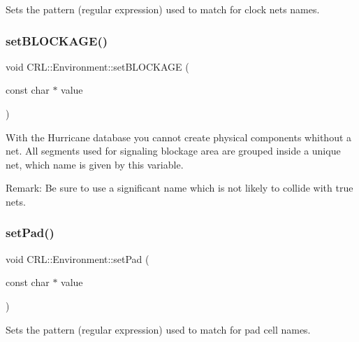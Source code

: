 Sets the pattern (regular expression) used to match for clock nets names. \mbox{\label{classCRL_1_1Environment_af18cbbcdfb458b69dbb6de0dbb564a3a}} 
\subsubsection{\texorpdfstring{set\+B\+L\+O\+C\+K\+A\+G\+E()}{setBLOCKAGE()}}
{\footnotesize\ttfamily void C\+R\+L\+::\+Environment\+::set\+B\+L\+O\+C\+K\+A\+GE (\begin{DoxyParamCaption}\item[{const char $\ast$}]{value }\end{DoxyParamCaption})}

With the Hurricane database you cannot create physical components whithout a net. All segments used for signaling blockage area are grouped inside a unique net, which name is given by this variable.

\begin{DoxyParagraph}{Remark\+:}
Be sure to use a significant name which is not likely to collide with true nets. 
\end{DoxyParagraph}
\mbox{\label{classCRL_1_1Environment_a06c179d70d3065f0bfe398a02e4c6359}} 
\subsubsection{\texorpdfstring{set\+Pad()}{setPad()}}
{\footnotesize\ttfamily void C\+R\+L\+::\+Environment\+::set\+Pad (\begin{DoxyParamCaption}\item[{const char $\ast$}]{value }\end{DoxyParamCaption})}

Sets the pattern (regular expression) used to match for pad cell names. \mbox{\label{classCRL_1_1Environment_a02b727f207875cebefbb59842c1efe70}} 
